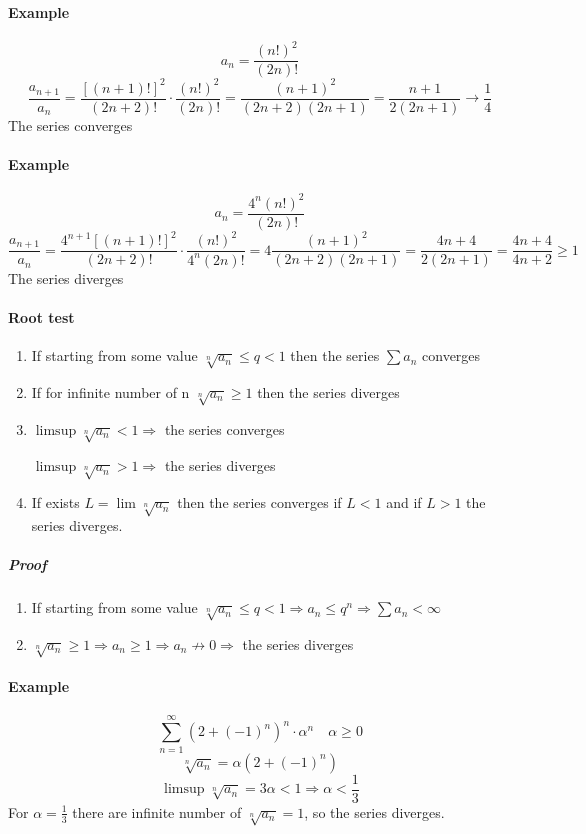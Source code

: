 \paragraph{Example}
$$a_n = \frac{\left(n!\right)^2}{\left(2n\right)!}$$
$$\frac{a_{n+1}}{a_n} = \frac{\left[\left(n+1\right)!\right]^2}{(2n+2)!}\cdot \frac{\left(n!\right)^2}{\left(2n\right)!} = \frac{(n+1)^2}{(2n+2)(2n+1)} = \frac{n+1}{2(2n+1)} \to \frac{1}{4}$$
The series converges
\paragraph{Example}
$$a_n = \frac{4^n \left(n!\right)^2}{\left(2n\right)!}$$
$$\frac{a_{n+1}}{a_n} = \frac{4^{n+1}\left[\left(n+1\right)!\right]^2}{(2n+2)!}\cdot \frac{\left(n!\right)^2}{4^n\left(2n\right)!} = 4\frac{(n+1)^2}{(2n+2)(2n+1)} = \frac{4n+4}{2(2n+1)} = \frac{4n+4}{4n+2} \geq 1$$
The series diverges
\paragraph{Root test} 
\begin{enumerate}
	\item If starting from some value $\sqrt[n]{a_n} \leq q < 1$ then the series $\sum a_n$ converges
	\item If for infinite number of n $\sqrt[n]{a_n} \geq 1$ then the series diverges
	\item $\limsup \sqrt[n]{a_n} <  1 \Rightarrow$ the series converges
	      
	      $\limsup \sqrt[n]{a_n} > 1 \Rightarrow $ the series diverges
	\item If exists $L = \lim \sqrt[n]{a_n}$ then the series converges if $L<1$ and if $L>1$ the series diverges.
\end{enumerate}
\subparagraph{Proof} 
\begin{enumerate}
	\item If starting from some value $\sqrt[n]{a_n} \leq q < 1 \Rightarrow a_n \leq q^n \Rightarrow \sum a_n < \infty$  
	\item $\sqrt[n]{a_n} \geq 1 \Rightarrow a_n \geq 1 \Rightarrow a_n \not\to 0 \Rightarrow$ the series diverges
\end{enumerate}

\paragraph{Example}
$$\sum_{n=1}^\infty \left( 2 + (-1)^n \right)^n \cdot \alpha^n \quad \alpha \geq 0$$
$$\sqrt[n]{a_n} = \alpha (2+(-1)^n)$$
$$\limsup \sqrt[n]{a_n} = 3\alpha < 1 \Rightarrow \alpha < \frac{1}{3}$$
For $\alpha=\frac{1}{3}$ there are infinite number of $\sqrt[n]{a_n} = 1$, so the series diverges.
